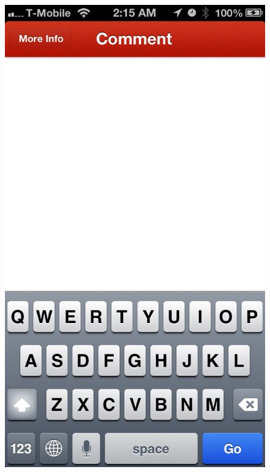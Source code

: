 \begin{figure}
{	\includegraphics[width=\figwidth, totalheight=\figheight, keepaspectratio]{./screenshots/home-comment.png}}  \hfill
\end{figure}
